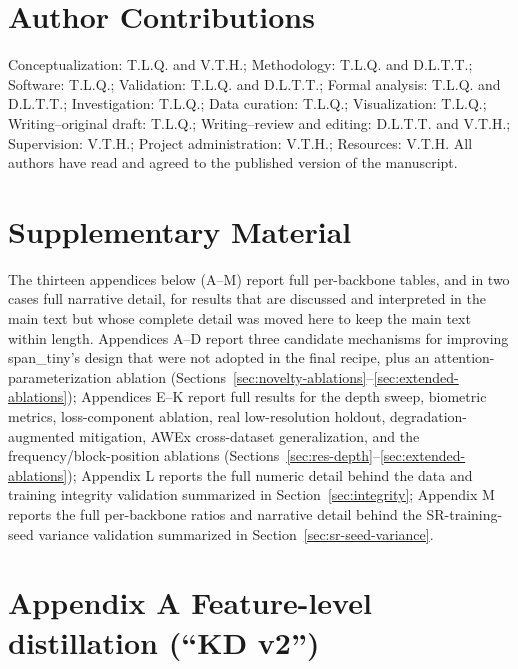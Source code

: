 \documentclass[pdflatex,sn-vancouver-num]{sn-jnl}
\newcommand{\appendixtablenumbering}[1]{%
  \renewcommand{\thetable}{#1\arabic{table}}%
  \renewcommand{\theHtable}{appendix-#1.\arabic{table}}%
  \setcounter{table}{0}%
}
\begin{document}
\par
\endgroup

\section*{Author Contributions}

Conceptualization: T.L.Q. and V.T.H.; Methodology: T.L.Q. and D.L.T.T.; Software: T.L.Q.; Validation: T.L.Q. and D.L.T.T.; Formal analysis: T.L.Q. and D.L.T.T.; Investigation: T.L.Q.; Data curation: T.L.Q.; Visualization: T.L.Q.; Writing--original draft: T.L.Q.; Writing--review and editing: D.L.T.T. and V.T.H.; Supervision: V.T.H.; Project administration: V.T.H.; Resources: V.T.H. All authors have read and agreed to the published version of the manuscript.

\clearpage
\appendix
\label{sec:supplementary}

\section*{Supplementary Material}

The thirteen appendices below (A--M) report full per-backbone tables, and in two cases full narrative detail, for results that are discussed and interpreted in the main text but whose complete detail was moved here to keep the main text within length. Appendices A--D report three candidate mechanisms for improving span\_tiny's design that were not adopted in the final recipe, plus an attention-parameterization ablation (Sections~\ref{sec:novelty-ablations}--\ref{sec:extended-ablations}); Appendices E--K report full results for the depth sweep, biometric metrics, loss-component ablation, real low-resolution holdout, degradation-augmented mitigation, AWEx cross-dataset generalization, and the frequency/block-position ablations (Sections~\ref{sec:res-depth}--\ref{sec:extended-ablations}); Appendix L reports the full numeric detail behind the data and training integrity validation summarized in Section~\ref{sec:integrity}; Appendix M reports the full per-backbone ratios and narrative detail behind the SR-training-seed variance validation summarized in Section~\ref{sec:sr-seed-variance}.

\section*{Appendix A Feature-level distillation (``KD v2'')}
\appendixtablenumbering{A}
\end{document}
